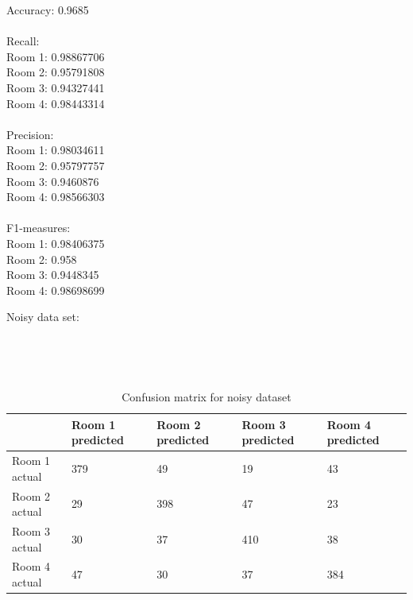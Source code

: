 \documentclass{article}
\begin{document}
Accuracy: 0.9685 \\
\\
Recall: \\
Room 1: 0.98867706 \\
Room 2: 0.95791808 \\
Room 3: 0.94327441 \\
Room 4: 0.98443314 \\
\\
Precision: \\
Room 1: 0.98034611 \\
Room 2: 0.95797757 \\
Room 3: 0.9460876 \\
Room 4: 0.98566303 \\
\\
F1-measures: \\
Room 1: 0.98406375 \\
Room 2: 0.958  \\
Room 3: 0.9448345 \\
Room 4: 0.98698699 \\
\pagebreak 

\begin{center}
Noisy data set:
\end{center}
  \\

\renewcommand{\arraystretch}{2}  
\begin{table}[htb]
  \caption{Confusion matrix for noisy dataset} \\
  \begin{tabular}{|l|l|l|l|l|}
  \hline
                & Room 1 predicted & Room 2 predicted & Room 3 predicted & Room 4 predicted \\ \hline
  Room 1 actual & 379              & 49               & 19               & 43               \\ \hline
  Room 2 actual & 29               & 398              & 47               & 23               \\ \hline
  Room 3 actual & 30               & 37               & 410              & 38               \\ \hline
  Room 4 actual & 47               & 30               & 37               & 384              \\ \hline
  \end{tabular}
\end{table}
\end{document}
